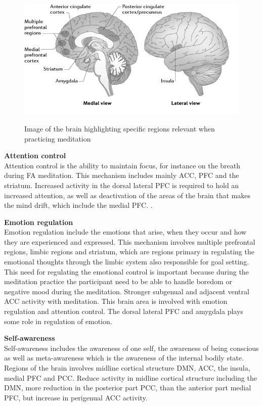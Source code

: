 
\begin{figure}[H]
	\includegraphics[width=1\textwidth]{figures/brain_meditation.png} 
	\caption{Image of the brain highlighting specific regions relevant when practicing meditation}
	\label{fig:brain_meditation}  
	\cite{Tang2017}
\end{figure}   

\textbf{Attention control}\\
Attention control is the ability to maintain focus, for instance on the breath during FA meditation. This mechanism includes mainly ACC, PFC and the striatum. Increased activity in the dorsal lateral PFC is required to hold an increased attention, as well as deactivation of the areas of the brain that makes the mind drift, which include the medial PFC. \cite{Tang2017}.

\textbf{Emotion regulation}\\
Emotion regulation include the emotions that arise, when they occur and how they are experienced and expressed. This mechanism involves multiple prefrontal regions, limbic regions and striatum, which are regions primary in regulating the emotional thoughts through the limbic system also responsible for goal setting. This need for regulating the emotional control is important because during the meditation practice the participant need to be able to handle boredom or negative mood during the meditation. Stronger subgenual and adjacent ventral ACC activity with meditation. This brain area is involved with emotion regulation and attention control. The dorsal lateral PFC and amygdala plays some role in regulation of emotion. 

\textbf{Self-awareness}\\
Self-awareness includes the awareness of one self, the awareness of being conscious as well as meta-awareness which is the awareness of the internal bodily state. Regions of the brain involves midline cortical structure DMN, ACC, the insula, medial PFC and PCC. Reduce activity in midline cortical structure including the DMN, more reduction in the posterior part PCC, than the anterior part medial PFC, but increase in perigenual ACC activity.

